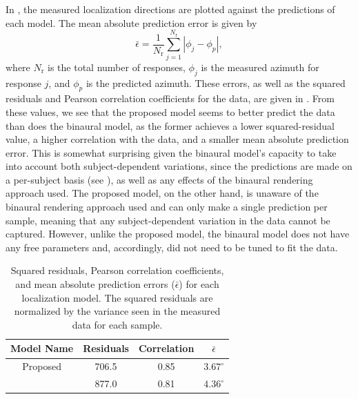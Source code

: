 In , the measured localization directions are plotted against the predictions of each model.
The mean absolute prediction error is given by
\begin{equation}
\bar{\epsilon} = \frac{1}{N_\text{r}} \sum_{j = 1}^{N_\text{r}} | \phi_j - \phi_p |,
\end{equation}
where $N_\text{r}$ is the total number of responses, $\phi_j$ is the measured azimuth for response $j$, and $\phi_p$ is the predicted azimuth.
These errors, as well as the squared residuals and Pearson correlation coefficients for the data, are given in .
From these values, we see that the proposed model seems to better predict the data than does the binaural model, as the former achieves a lower squared-residual value, a higher correlation with the data, and a smaller mean absolute prediction error.
This is somewhat surprising given the binaural model's capacity to take into account both subject-dependent variations, since the predictions are made on a per-subject basis (see ), as well as any effects of the binaural rendering approach used.
The proposed model, on the other hand, is unaware of the binaural rendering approach used and can only make a single prediction per sample, meaning that any subject-dependent variation in the data cannot be captured.
However, unlike the proposed model, the binaural model does not have any free parameters and, accordingly, did not need to be tuned to fit the data.

\begin{table}[t]
\centering
 \begin{tabular}{|c|c|c|c|} \hline
 \textbf{Model Name} & \textbf{Residuals} & \textbf{Correlation} & $\bar{\epsilon}$ \\ \hline
 Proposed & 706.5 & 0.85 & $3.67^\circ$ \\
 \citet{Dietz2011} & 877.0 & 0.81 & $4.36^\circ$ \\ \hline
 \end{tabular}
 \caption[Prediction errors and correlation coefficients for each localization model.]{
 Squared residuals, Pearson correlation coefficients, and mean absolute prediction errors ($\bar{\epsilon}$) for each localization model.
 The squared residuals are normalized by the variance seen in the measured data for each sample.}
 \label{tab:Localization_Model_Results}
\end{table}

